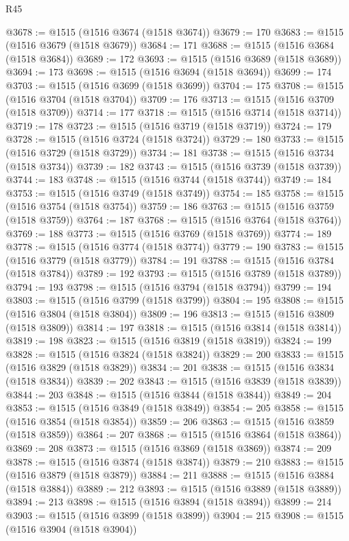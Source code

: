 \begin{lexlean}{R45}
\begin{coremodule}
{@3678 := @1515 (@1516 @3674 (@1518 @3674))
@3679 := 170
@3683 := @1515 (@1516 @3679 (@1518 @3679))
@3684 := 171
@3688 := @1515 (@1516 @3684 (@1518 @3684))
@3689 := 172
@3693 := @1515 (@1516 @3689 (@1518 @3689))
@3694 := 173
@3698 := @1515 (@1516 @3694 (@1518 @3694))
@3699 := 174
@3703 := @1515 (@1516 @3699 (@1518 @3699))
@3704 := 175
@3708 := @1515 (@1516 @3704 (@1518 @3704))
@3709 := 176
@3713 := @1515 (@1516 @3709 (@1518 @3709))
@3714 := 177
@3718 := @1515 (@1516 @3714 (@1518 @3714))
@3719 := 178
@3723 := @1515 (@1516 @3719 (@1518 @3719))
@3724 := 179
@3728 := @1515 (@1516 @3724 (@1518 @3724))
@3729 := 180
@3733 := @1515 (@1516 @3729 (@1518 @3729))
@3734 := 181
@3738 := @1515 (@1516 @3734 (@1518 @3734))
@3739 := 182
@3743 := @1515 (@1516 @3739 (@1518 @3739))
@3744 := 183
@3748 := @1515 (@1516 @3744 (@1518 @3744))
@3749 := 184
@3753 := @1515 (@1516 @3749 (@1518 @3749))
@3754 := 185
@3758 := @1515 (@1516 @3754 (@1518 @3754))
@3759 := 186
@3763 := @1515 (@1516 @3759 (@1518 @3759))
@3764 := 187
@3768 := @1515 (@1516 @3764 (@1518 @3764))
@3769 := 188
@3773 := @1515 (@1516 @3769 (@1518 @3769))
@3774 := 189
@3778 := @1515 (@1516 @3774 (@1518 @3774))
@3779 := 190
@3783 := @1515 (@1516 @3779 (@1518 @3779))
@3784 := 191
@3788 := @1515 (@1516 @3784 (@1518 @3784))
@3789 := 192
@3793 := @1515 (@1516 @3789 (@1518 @3789))
@3794 := 193
@3798 := @1515 (@1516 @3794 (@1518 @3794))
@3799 := 194
@3803 := @1515 (@1516 @3799 (@1518 @3799))
@3804 := 195
@3808 := @1515 (@1516 @3804 (@1518 @3804))
@3809 := 196
@3813 := @1515 (@1516 @3809 (@1518 @3809))
@3814 := 197
@3818 := @1515 (@1516 @3814 (@1518 @3814))
@3819 := 198
@3823 := @1515 (@1516 @3819 (@1518 @3819))
@3824 := 199
@3828 := @1515 (@1516 @3824 (@1518 @3824))
@3829 := 200
@3833 := @1515 (@1516 @3829 (@1518 @3829))
@3834 := 201
@3838 := @1515 (@1516 @3834 (@1518 @3834))
@3839 := 202
@3843 := @1515 (@1516 @3839 (@1518 @3839))
@3844 := 203
@3848 := @1515 (@1516 @3844 (@1518 @3844))
@3849 := 204
@3853 := @1515 (@1516 @3849 (@1518 @3849))
@3854 := 205
@3858 := @1515 (@1516 @3854 (@1518 @3854))
@3859 := 206
@3863 := @1515 (@1516 @3859 (@1518 @3859))
@3864 := 207
@3868 := @1515 (@1516 @3864 (@1518 @3864))
@3869 := 208
@3873 := @1515 (@1516 @3869 (@1518 @3869))
@3874 := 209
@3878 := @1515 (@1516 @3874 (@1518 @3874))
@3879 := 210
@3883 := @1515 (@1516 @3879 (@1518 @3879))
@3884 := 211
@3888 := @1515 (@1516 @3884 (@1518 @3884))
@3889 := 212
@3893 := @1515 (@1516 @3889 (@1518 @3889))
@3894 := 213
@3898 := @1515 (@1516 @3894 (@1518 @3894))
@3899 := 214
@3903 := @1515 (@1516 @3899 (@1518 @3899))
@3904 := 215
@3908 := @1515 (@1516 @3904 (@1518 @3904))
}
\end{coremodule}
\end{lexlean}
